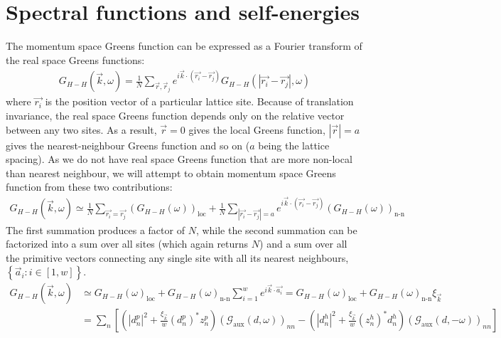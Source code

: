 \documentclass[10pt]{report}
\numberwithin{equation}{section}
\begin{document}
\section{Spectral functions and self-energies}

The momentum space Greens function can be expressed as a Fourier transform of the real space Greens functions:
\begin{equation}\begin{aligned}
	G_{H-H} (\vec k, \omega) = \frac{1}{N}\sum_{\vec r, \vec r_j}e^{i \vec{k}\cdot\left(\vec{r_i} - \vec {r_j}\right)}G_{H-H} (|\vec{r_i} - \vec {r_j}|, \omega)
\end{aligned}\end{equation}
where $\vec{r_i}$ is the position vector of a particular lattice site. Because of translation invariance, the real space Greens function depends only on the relative vector between any two sites. As a result, $\vec r=0$ gives the local Greens function, $|\vec r|=a$ gives the nearest-neighbour Greens function and so on ($a$ being the lattice spacing). As we do not have real space Greens function that are more non-local than nearest neighbour, we will attempt to obtain momentum space Greens function from these two contributions:
\begin{equation}\begin{aligned}
	G_{H-H} (\vec k, \omega) \simeq \frac{1}{N}\sum_{\vec{r_i} = \vec {r_j}}\left(G_{H-H} (\omega)\right) _\text{loc} + \frac{1}{N}\sum_{|\vec{r_i} - \vec {r_j}|=a} e^{i \vec{k}\cdot\left(\vec{r_i} - \vec {r_j}\right)}\left(G_{H-H} (\omega)\right)_\text{n-n}
\end{aligned}\end{equation}
The first summation produces a factor of $N$, while the second summation can be factorized into a sum over all sites (which again returns $N$) and a sum over all the primitive vectors connecting any single site with all its nearest neighbours, $\left\{ \vec a_i: i \in \left[1, w\right]\right\}$.
\begin{equation}\begin{aligned}
	\label{k_Gf_siam}
	G_{H-H} (\vec k, \omega) &\simeq G_{H-H} (\omega)_\text{loc} + G_{H-H} (\omega)_\text{n-n}\sum_{i=1}^w e^{i \vec{k}\cdot\vec {a_i}} = G_{H-H} (\omega)_\text{loc} + G_{H-H} (\omega)_\text{n-n} \xi_{\vec k}\\
			     &= \sum_n\left[\left(|d^p_n|^2 + \frac{\xi_{\vec k}}{w}\left(d^p_n\right)^* z^p_n\right) \left(\mathcal{G}_\text{aux}(d, \omega)\right)_{nn} - \left(|d^h_n|^2 + \frac{\xi_{\vec k}}{w}\left(z^h_n\right)^* d^h_n\right) \left(\mathcal{G}_\text{aux}(d, -\omega)\right)_{nn}\right]
\end{aligned}\end{equation}
\end{document}
